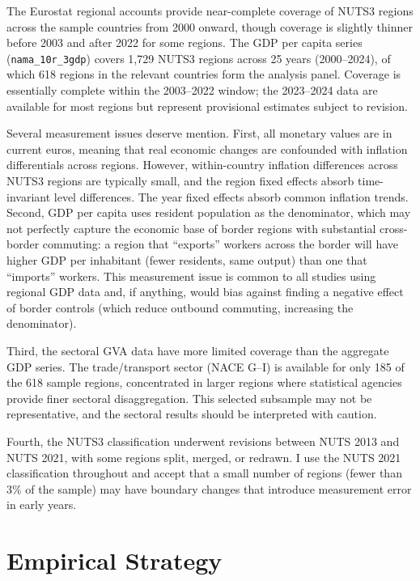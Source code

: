 \documentclass[12pt]{article}
\begin{document}
The Eurostat regional accounts provide near-complete coverage of NUTS3 regions across the sample countries from 2000 onward, though coverage is slightly thinner before 2003 and after 2022 for some regions. The GDP per capita series (\texttt{nama\_10r\_3gdp}) covers 1,729 NUTS3 regions across 25 years (2000--2024), of which 618 regions in the relevant countries form the analysis panel. Coverage is essentially complete within the 2003--2022 window; the 2023--2024 data are available for most regions but represent provisional estimates subject to revision.

Several measurement issues deserve mention. First, all monetary values are in current euros, meaning that real economic changes are confounded with inflation differentials across regions. However, within-country inflation differences across NUTS3 regions are typically small, and the region fixed effects absorb time-invariant level differences. The year fixed effects absorb common inflation trends. Second, GDP per capita uses resident population as the denominator, which may not perfectly capture the economic base of border regions with substantial cross-border commuting: a region that ``exports'' workers across the border will have higher GDP per inhabitant (fewer residents, same output) than one that ``imports'' workers. This measurement issue is common to all studies using regional GDP data and, if anything, would bias against finding a negative effect of border controls (which reduce outbound commuting, increasing the denominator).

Third, the sectoral GVA data have more limited coverage than the aggregate GDP series. The trade/transport sector (NACE G--I) is available for only 185 of the 618 sample regions, concentrated in larger regions where statistical agencies provide finer sectoral disaggregation. This selected subsample may not be representative, and the sectoral results should be interpreted with caution.

Fourth, the NUTS3 classification underwent revisions between NUTS 2013 and NUTS 2021, with some regions split, merged, or redrawn. I use the NUTS 2021 classification throughout and accept that a small number of regions (fewer than 3\% of the sample) may have boundary changes that introduce measurement error in early years.


\section{Empirical Strategy}
\end{document}
